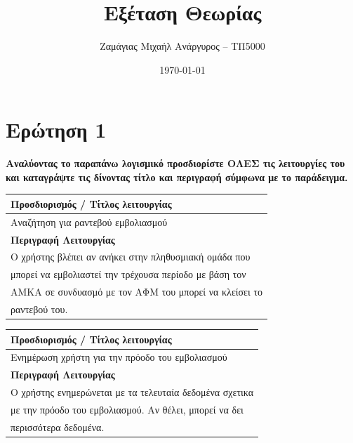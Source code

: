 \documentclass[12pt]{turabian-researchpaper}
\title{Εξέταση Θεωρίας}
\author{Ζαμάγιας Μιχαήλ Ανάργυρος -- ΤΠ5000}
\date{\today}
\begin{document}
\begin{titlepage}
    \maketitle
\end{titlepage}

\tableofcontents

\newpage

\section{Ερώτηση 1}
\textbf{Αναλύοντας το παραπάνω λογισμικό προσδιορίστε ΟΛΕΣ τις λειτουργίες του και καταγράψτε τις δίνοντας τίτλο και περιγραφή σύμφωνα με το παράδειγμα.}

\begin{center}

    \begin{table}[]
        \centering
        \begin{tabular}{|l|}
            \hline
            \textbf{Προσδιορισμός / Τίτλος λειτουργίας}            \\ \hline
            Αναζήτηση για ραντεβού εμβολιασμού                     \\ \hline
            \textbf{Περιγραφή Λειτουργίας}                         \\ \hline
            Ο χρήστης βλέπει αν ανήκει στην πληθυσμιακή ομάδα που  \\
            μπορεί να εμβολιαστεί την τρέχουσα περίοδο με βάση τον \\
            ΑΜΚΑ σε συνδυασμό με τον ΑΦΜ του μπορεί να κλείσει το  \\
            ραντεβού του.                                          \\ \hline
        \end{tabular}
    \end{table}

    \begin{table}[]
        \centering
        \begin{tabular}{|l|}
            \hline
            \textbf{Προσδιορισμός / Τίτλος λειτουργίας}             \\ \hline
            Ενημέρωση χρήστη για την πρόοδο του εμβολιασμού         \\ \hline
            \textbf{Περιγραφή Λειτουργίας}                          \\ \hline
            Ο χρήστης ενημερώνεται με τα τελευταία δεδομένα σχετικα \\
            με την πρόοδο του εμβολιασμού. Αν θέλει, μπορεί να δει  \\
            περισσότερα δεδομένα.                                   \\ \hline
        \end{tabular}
    \end{table}


\end{center}
\end{document}

